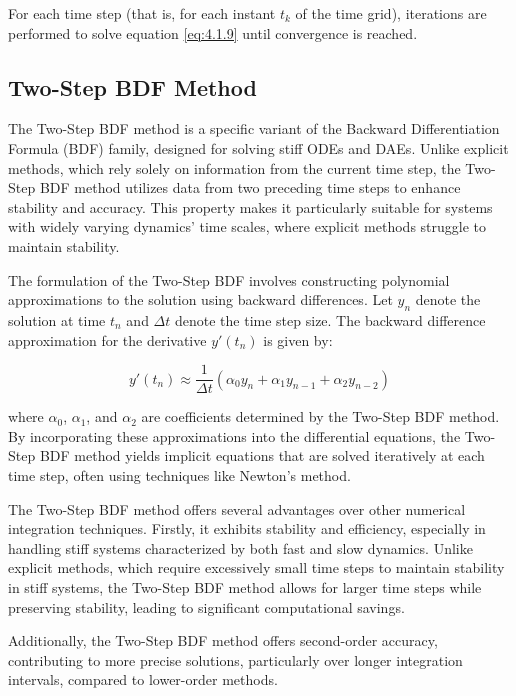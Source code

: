 For each time step (that is, for each instant \( t_k \) of the time grid), iterations are performed to solve equation \ref{eq:4.1.9} until convergence is reached.

\subsection{Two-Step BDF Method}
The Two-Step BDF method is a specific variant of the Backward Differentiation Formula (BDF) family, designed for solving stiff ODEs and DAEs. Unlike explicit methods, which rely solely on information from the current time step, the Two-Step BDF method utilizes data from two preceding time steps to enhance stability and accuracy. This property makes it particularly suitable for systems with widely varying dynamics' time scales, where explicit methods struggle to maintain stability.

The formulation of the Two-Step BDF involves constructing polynomial approximations to the solution using backward differences. Let \( y_n \) denote the solution at time \( t_n \) and \( \Delta t \) denote the time step size. The backward difference approximation for the derivative \( y'(t_n) \) is given by:

\begin{equation}
    y'(t_n) \approx \frac{1}{\Delta t} \left( \alpha_0 y_n + \alpha_1 y_{n-1} + \alpha_2 y_{n-2} \right)
\end{equation}

where \( \alpha_0 \), \( \alpha_1 \), and \( \alpha_2 \) are coefficients determined by the Two-Step BDF method. By incorporating these approximations into the differential equations, the Two-Step BDF method yields implicit equations that are solved iteratively at each time step, often using techniques like Newton's method.

The Two-Step BDF method offers several advantages over other numerical integration techniques. Firstly, it exhibits stability and efficiency, especially in handling stiff systems characterized by both fast and slow dynamics. Unlike explicit methods, which require excessively small time steps to maintain stability in stiff systems, the Two-Step BDF method allows for larger time steps while preserving stability, leading to significant computational savings.

Additionally, the Two-Step BDF method offers second-order accuracy, contributing to more precise solutions, particularly over longer integration intervals, compared to lower-order methods.

